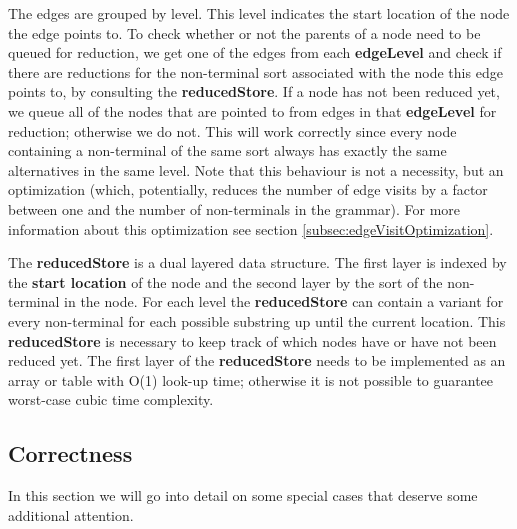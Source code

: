 \documentclass[a4paper,10pt]{article}
\begin{document}
The edges are grouped by level. This level indicates the start location of the node the edge points to. To check whether or not the parents of a node need to be queued for reduction, we get one of the edges from each {\bf edgeLevel} and check if there are reductions for the non-terminal sort associated with the node this edge points to, by consulting the {\bf reducedStore}. If a node has not been reduced yet, we queue all of the nodes that are pointed to from edges in that {\bf edgeLevel} for reduction; otherwise we do not. This will work correctly since every node containing a non-terminal of the same sort always has exactly the same alternatives in the same level. Note that this behaviour is not a necessity, but an optimization (which, potentially, reduces the number of edge visits by a factor between one and the number of non-terminals in the grammar). For more information about this optimization see section \ref{subsec:edgeVisitOptimization}.

The {\bf reducedStore} is a dual layered data structure. The first layer is indexed by the {\bf start location} of the node and the second layer by the sort of the non-terminal in the node. For each level the {\bf reducedStore} can contain a variant for every non-terminal for each possible substring up until the current location. This {\bf reducedStore} is necessary to keep track of which nodes have or have not been reduced yet. The first layer of the {\bf reducedStore} needs to be implemented as an array or table with O(1) look-up time; otherwise it is not possible to guarantee worst-case cubic time complexity.

\subsection{Correctness}

In this section we will go into detail on some special cases that deserve some additional attention.
\end{document}
